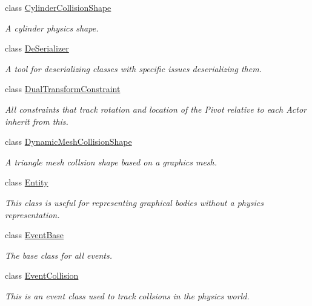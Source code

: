 \begin{DoxyCompactItemize}
class \hyperlink{classMezzanine_1_1CylinderCollisionShape}{CylinderCollisionShape}
\begin{DoxyCompactList}\small\item\em A cylinder physics shape. \item\end{DoxyCompactList}\item 
class \hyperlink{classMezzanine_1_1DeSerializer}{DeSerializer}
\begin{DoxyCompactList}\small\item\em A tool for deserializing classes with specific issues deserializing them. \item\end{DoxyCompactList}\item 
class \hyperlink{classMezzanine_1_1DualTransformConstraint}{DualTransformConstraint}
\begin{DoxyCompactList}\small\item\em All constraints that track rotation and location of the Pivot relative to each Actor inherit from this. \item\end{DoxyCompactList}\item 
class \hyperlink{classMezzanine_1_1DynamicMeshCollisionShape}{DynamicMeshCollisionShape}
\begin{DoxyCompactList}\small\item\em A triangle mesh collsion shape based on a graphics mesh. \item\end{DoxyCompactList}\item 
class \hyperlink{classMezzanine_1_1Entity}{Entity}
\begin{DoxyCompactList}\small\item\em This class is useful for representing graphical bodies without a physics representation. \item\end{DoxyCompactList}\item 
class \hyperlink{classMezzanine_1_1EventBase}{EventBase}
\begin{DoxyCompactList}\small\item\em The base class for all events. \item\end{DoxyCompactList}\item 
class \hyperlink{classMezzanine_1_1EventCollision}{EventCollision}
\begin{DoxyCompactList}\small\item\em This is an event class used to track collsions in the physics world. \item\end{DoxyCompactList}\item 

\end{DoxyCompactItemize}
